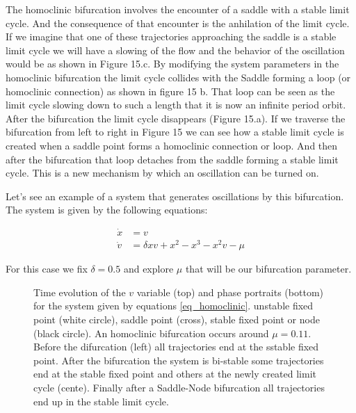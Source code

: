 \documentclass{article}
\begin{document}
The homoclinic bifurcation involves the encounter of a saddle with a stable limit cycle. 
And the consequence of that encounter is the anhilation of the limit cycle. 
If we imagine that one of these trajectories approaching the saddle is a stable limit cycle we will have a slowing of the flow and the behavior of the oscillation would be as shown in Figure 15.c. 
By modifying the system parameters in the homoclinic bifurcation the limit cycle collides with the Saddle forming a loop (or homoclinic connection) as shown in figure 15 b. 
That loop can be seen as the limit cycle slowing down to such a length that it is now an infinite period orbit. After the bifurcation the limit cycle disappears (Figure 15.a).
If we traverse the bifurcation from left to right in Figure 15 we can see how a stable limit cycle is created when a saddle point forms a homoclinic connection or loop. And then after the bifurcation that loop detaches from the saddle forming a stable limit cycle. This is a new mechanism by which an oscillation can be turned on.

Let's see an example of a system that generates oscillations by this bifurcation. The system is given by the following equations:

\begin{subequations} \label{eq_homoclinic}
\begin{align}
    \dot{x} & = v \\
    \dot{v} & = \delta xv + x^2 - x^3 -x^2v - \mu
\end{align}
\end{subequations}

For this case we fix $\delta=0.5$ and explore $\mu$ that will be our bifurcation parameter. 

\begin{figure}[h!]
    \centering
    \caption{Time evolution of the $v$ variable (top) and phase portraits (bottom) for the system given by equations \ref{eq_homoclinic}.
    unstable fixed point (white circle), saddle point (cross), stable fixed point or node (black circle). An homoclinic bifurcation occurs around $\mu=0.11$. Before the difurcation (left) all trajectories end at the sstable fixed point. After the bifurcation the system is bi-stable some trajectories end at the stable fixed point and others at the newly created limit cycle (cente). Finally after a Saddle-Node bifurcation all trajectories end up in the stable limit cycle.} 
    \label{fig_homoclinic}
\end{figure}
\end{document}
